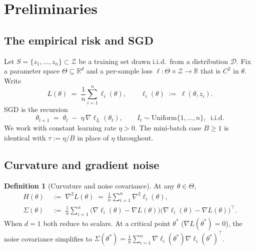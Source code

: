\documentclass[11pt,a4paper]{article}
\theoremstyle{definition}
\newtheorem{definition}[theorem]{Definition}
\theoremstyle{remark}
\newcommand{\R}{\mathbb{R}}
\begin{document}
\section{Preliminaries}\label{sec:prelim}

\subsection{The empirical risk and SGD}\label{sec:sgd}

Let $S = \{z_1,\dots,z_n\} \subset \mathcal{Z}$ be a training set drawn
i.i.d.\ from a distribution $\mathcal{D}$.  Fix a parameter space
$\Theta \subseteq \R^d$ and a per-sample loss
$\ell:\Theta \times \mathcal{Z}\to \R$ that is $C^2$ in $\theta$.  Write
\[
   L(\theta) \;=\; \frac{1}{n}\sum_{i=1}^n \ell_i(\theta),
   \qquad
   \ell_i(\theta) \;:=\; \ell(\theta,z_i).
\]
SGD is the recursion
\begin{equation}\label{eq:sgd-recursion}
   \theta_{t+1} \;=\; \theta_t \;-\; \eta\,\nabla \ell_{I_t}(\theta_t),
   \qquad I_t \sim \mathrm{Uniform}\{1,\dots,n\},\;\; \text{i.i.d.}
\end{equation}
We work with constant learning rate $\eta>0$.  The mini-batch case
$B\geq 1$ is identical with $\tau:=\eta/B$ in place of $\eta$ throughout.

\subsection{Curvature and gradient noise}

\begin{definition}[Curvature and noise covariance]\label{def:H-Sigma}
   At any $\theta\in\Theta$,
   \begin{align*}
      H(\theta) &\;:=\; \nabla^2 L(\theta) \;=\;
                       \frac{1}{n}\sum_{i=1}^n \nabla^2 \ell_i(\theta),\\
      \Sigma(\theta) &\;:=\;
         \frac{1}{n}\sum_{i=1}^n
            \bigl(\nabla\ell_i(\theta) - \nabla L(\theta)\bigr)
            \bigl(\nabla\ell_i(\theta) - \nabla L(\theta)\bigr)^{\!\top}.
   \end{align*}
   When $d=1$ both reduce to scalars.  At a critical point $\theta^*$
   ($\nabla L(\theta^*)=0$), the noise covariance simplifies to
   $\Sigma(\theta^*) = \frac{1}{n}\sum_{i=1}^n \nabla\ell_i(\theta^*)
                                              \nabla\ell_i(\theta^*)^\top$.
\end{definition}
\end{document}
